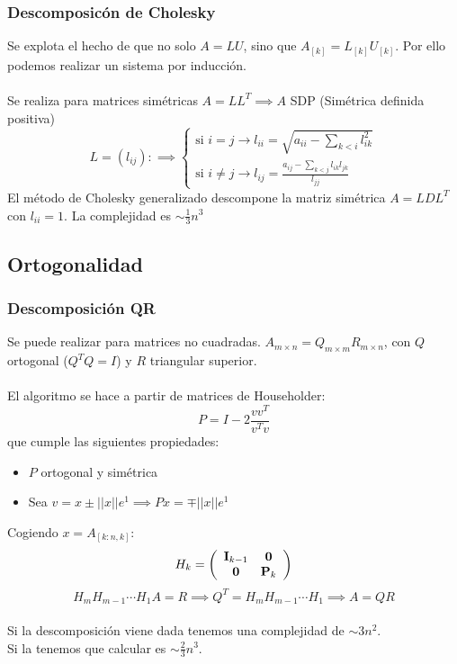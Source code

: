 \documentclass[leqno]{article}
\newcommand{\norm}[1]{\lvert \lvert #1 \rvert \rvert }
\begin{document}
\subsubsection{Descomposicón de Cholesky}
Se explota el hecho de que no solo $A=LU$, sino que $A_{[k]}=L_{[k]}U_{[k]}$. Por ello podemos realizar un sistema por inducción.\\
\\
Se realiza para matrices simétricas $A = LL^T \implies A$ SDP (Simétrica definida positiva)\\
\[ L = (l_{ij}): \implies
\begin{cases}
    \text{si } i = j \rightarrow l_{ii} = \sqrt{a_{ii}-\sum _{k<i} l_{ik}^2} \\
    \text{si } i \neq j \rightarrow l_{ij} = \frac{a_{ij} - \sum_{k<j} l_{ik}l_{jk}}{l_{jj}}
\end{cases}
\]
El método de Cholesky generalizado descompone la matriz simétrica $A = LDL^T$ con $l_{ii}=1$.
La complejidad es $\sim \frac{1}{3}n^3$

\subsection{Ortogonalidad}
\subsubsection{Descomposición QR}
Se puede realizar para matrices no cuadradas. $A_{m\times n}=Q_{m\times m}R_{m\times n}$, con $Q$ ortogonal ($Q^TQ=I$) y $R$ triangular superior. \\
\\
El algoritmo se hace a partir de matrices de Householder:
\[P = I - 2\frac{vv^T}{v^Tv}\]
que cumple las siguientes propiedades:
\begin{itemize}
    \item $P$ ortogonal y simétrica
    \item Sea $v = x\pm \norm{x}e^1 \implies Px = \mp \norm{x}e^1$ 
\end{itemize}
Cogiendo $x = A_{[k:n, k]}$:
\[H_k = \left(\begin{array}{cc}{\bf I}_{k-1}&{\bf0} \\ {\bf0}&{\bf P}_k\end{array}\right)\]
$$
H_mH_{m-1}\cdots H_1A = R \implies Q^T = H_mH_{m-1}\cdots H_1 \implies A = QR
$$
\\
Si la descomposición viene dada tenemos una complejidad de $\sim 3n^2$. \\
Si la tenemos que calcular es $\sim \frac{2}{3}n^3$.
\end{document}
